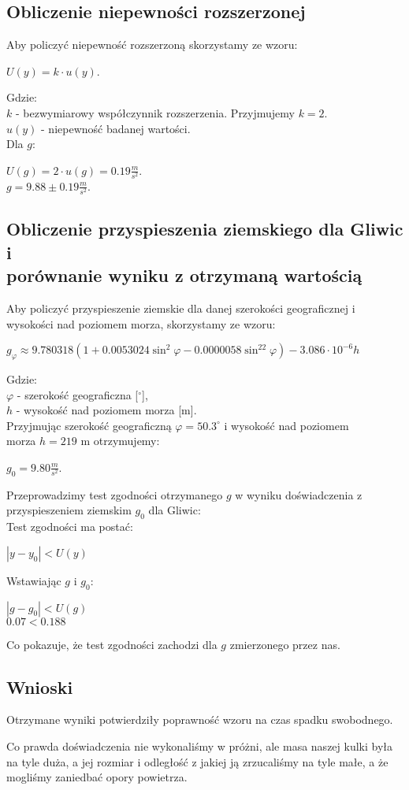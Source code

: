 \documentclass[12pt]{article}
\begin{document}
\subsection*{Obliczenie niepewności rozszerzonej}
Aby policzyć niepewność rozszerzoną skorzystamy ze wzoru:
\begin{center}
    $U(y) = k \cdot u(y)$.
\end{center}
Gdzie: \\
\indent $k$ - bezwymiarowy współczynnik rozszerzenia. Przyjmujemy $k=2$. \\
\indent $u(y)$ - niepewność badanej wartości. \\
Dla $g$:
\begin{center}
    $U(g) = 2 \cdot u(g) = 0.19 \frac{m}{s^2}$. \\
    $g = 9.88 \pm 0.19 \frac{m}{s^2}$.
\end{center}
\subsection*{Obliczenie przyspieszenia ziemskiego dla Gliwic i \\
    porównanie wyniku z otrzymaną wartością}

Aby policzyć przyspieszenie ziemskie dla danej szerokości geograficznej i
wysokości nad poziomem morza, skorzystamy ze wzoru:
\begin{center}
    $g_{\varphi} \approx 9.780318(1+0.0053024\sin^2\varphi -
        0.0000058\sin^22\varphi)-3.086 \cdot 10^{-6}h$
\end{center}
Gdzie: \\
\indent $\varphi$ - szerokość geograficzna [$^{\circ}$], \\
\indent $h$ - wysokość nad poziomem morza [m]. \\
Przyjmując szerokość geograficzną $\varphi = 50.3^{\circ}$ i wysokość nad
poziomem \\
morza $h = 219$ m otrzymujemy:
\begin{center}
    $g_0 = 9.80 \frac{m}{s^2}$.
\end{center}
Przeprowadzimy test zgodności otrzymanego $g$ w wyniku doświadczenia z
przyspieszeniem ziemskim $g_0$ dla Gliwic: \\
Test zgodności ma postać:
\begin{center}
    $|y - y_0| < U(y)$ \\
\end{center}
Wstawiając $g$ i $g_0$:
\begin{center}
    $|g - g_0| < U(g)$ \\
    $ 0.07 < 0.188 $
\end{center}
Co pokazuje, że test zgodności zachodzi dla $g$ zmierzonego przez nas.

\subsection*{Wnioski}

Otrzymane wyniki potwierdziły poprawność wzoru na czas spadku swobodnego.

Co prawda doświadczenia nie wykonaliśmy w próżni, ale masa naszej kulki była na
tyle duża, a jej rozmiar i odległość z jakiej ją zrzucaliśmy na tyle małe, a że
mogliśmy zaniedbać opory powietrza.
\end{document}
